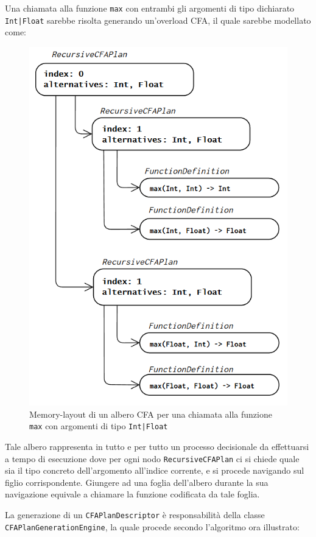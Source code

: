 \newpage

Una chiamata alla funzione \texttt{max} con entrambi gli argomenti di tipo dichiarato \texttt{Int|Float} sarebbe risolta 
generando un'overload CFA, il quale sarebbe modellato come: \\

\begin{figure}[h]
    \centering
        \includegraphics[height=0.9\textwidth]{../../Assets/CFA_ML.png}
    \caption{
        \centering
        Memory-layout di un albero CFA per una chiamata alla funzione
        \texttt{max} con argomenti di tipo \texttt{Int|Float}
    }
\end{figure}
\vspace{0.5cm}

Tale albero rappresenta in tutto e per tutto un processo decisionale da effettuarsi a tempo di esecuzione 
dove per ogni nodo \texttt{RecursiveCFAPlan} ci si chiede quale sia il tipo concreto dell'argomento 
all'indice corrente, e si procede navigando sul figlio corrispondente. Giungere ad una foglia dell'albero durante
la sua navigazione equivale a chiamare la funzione codificata da tale foglia. \\

\newpage

La generazione di un \texttt{CFAPlanDescriptor} è responsabilità della classe \texttt{CFAPlanGenerationEngine}, 
la quale procede secondo l'algoritmo ora illustrato: \\ 

